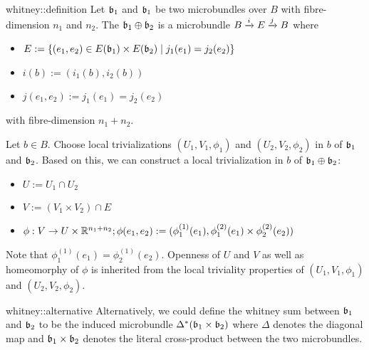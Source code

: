 \begin{mydefinition}{whitney::definition}
    Let $\bb_1$ and $\bb_1$ be two microbundles over $B$ with fibre-dimension $n_1$ and $n_2$.
    The  $\bb_1 \oplus \bb_2$ is a microbundle $\bundle{B}{E}{i}{j}$ where
    \begin{itemize}
        \item $E := \{ (e_1, e_2) \in E(\bb_1) \times E(\bb_2) \mid j_1(e_1) = j_2(e_2)\}$
        \item $i(b) := (i_1(b), i_2(b))$
        \item $j(e_1, e_2) := j_1(e_1) = j_2(e_2)$
    \end{itemize}
    with fibre-dimension $n_1 + n_2$.
\end{mydefinition}
\begin{myproof}
    Let $b \in B$.
    Choose local trivializations $(U_1, V_1, \phi_1)$ and $(U_2, V_2, \phi_2)$ in $b$ of $\bb_1$ and $\bb_2$.
    Based on this, we can construct a local trivialization in $b$ of $\bb_1 \oplus \bb_2$:
    \begin{itemize}
        \item $U := U_1 \cap U_2$
        \item $V := (V_1 \times V_2) \cap E$
        \item $\phi: V \to U \times \R^{n_1 + n_2}; \phi(e_1, e_2) := (\phi_1^{(1)}(e_1), \phi_1^{(2)}(e_1) \times  \phi_2^{(2)}(e_2))$
    \end{itemize}
    Note that $\phi_1^{(1)}(e_1) = \phi_2^{(1)}(e_2)$.
    Openness of $U$ and $V$ as well as homeomorphy of $\phi$ is inherited from the local triviality properties of $(U_1, V_1, \phi_1)$ and $(U_2, V_2, \phi_2)$.
\end{myproof}

\begin{myremark}{whitney::alternative}
    Alternatively, we could define the whitney sum between $\bb_1$ and $\bb_2$ to be the induced microbundle $\Delta^*(\bb_1 \times \bb_2)$
    where $\Delta$ denotes the diagonal map and $\bb_1 \times \bb_2$ denotes the literal cross-product between the two microbundles.
\end{myremark}